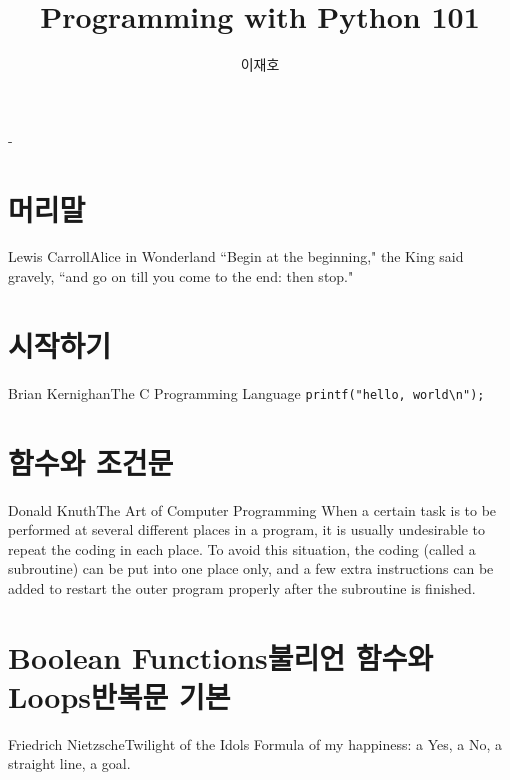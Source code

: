 \documentclass[a4paper,10pt]{memoir}
\title{Programming with Python 101}
\author{이재호}
\date{}
\begin{document}
\frontmatter
\begin{titlingpage}
  \setlength{\droptitle}{10.5cm}
  \calccentering{\unitlength}
  \begin{adjustwidth*}{\unitlength}{-\unitlength}
    \maketitle
  \end{adjustwidth*}
\end{titlingpage}

\tableofcontents

\chapter{머리말}
\begin{epi}{Lewis Carroll}{Alice in Wonderland}
  ``Begin at the beginning," the King said gravely, ``and go on till you come to the end: then stop."
\end{epi}


\mainmatter
\chapter{시작하기}
\begin{epi}{Brian Kernighan}{The C Programming Language}
  \texttt{printf("hello, world\textbackslash n");}
\end{epi}


\chapter{함수와 조건문}
\begin{epi}{Donald Knuth}{The Art of Computer Programming}
  When a certain task is to be performed at several different places in a program, it is usually undesirable to repeat the coding in each place.
  To avoid this situation, the coding (called a subroutine) can be put into one place only, and a few extra instructions can be added to restart the outer program properly after
the subroutine is finished.
\end{epi}


\chapter{Boolean Functions불리언 함수와 Loops반복문 기본}
\begin{epi}{Friedrich Nietzsche}{Twilight of the Idols}
  Formula of my happiness: a Yes, a No, a straight line, a goal.
\end{epi}

\end{document}
